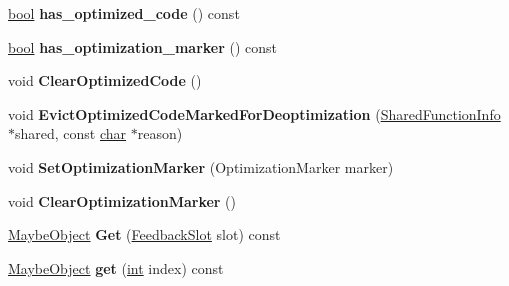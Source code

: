 \begin{DoxyCompactItemize}
\mbox{\hyperlink{classbool}{bool}} {\bfseries has\+\_\+optimized\+\_\+code} () const
\item 
\mbox{\label{classv8_1_1internal_1_1FeedbackVector_a53d2303ea56edeec2c69c9b21e463ce4}} 
\mbox{\hyperlink{classbool}{bool}} {\bfseries has\+\_\+optimization\+\_\+marker} () const
\item 
\mbox{\label{classv8_1_1internal_1_1FeedbackVector_ae38143d271689d1c7f162460772862f5}} 
void {\bfseries Clear\+Optimized\+Code} ()
\item 
\mbox{\label{classv8_1_1internal_1_1FeedbackVector_ab2598f90579fdd438d928e0ec2bf8dee}} 
void {\bfseries Evict\+Optimized\+Code\+Marked\+For\+Deoptimization} (\mbox{\hyperlink{classv8_1_1internal_1_1SharedFunctionInfo}{Shared\+Function\+Info}} $\ast$shared, const \mbox{\hyperlink{classchar}{char}} $\ast$reason)
\item 
\mbox{\label{classv8_1_1internal_1_1FeedbackVector_a2a8dd7f7d782fc6b3cbd9b8bc1ea0233}} 
void {\bfseries Set\+Optimization\+Marker} (Optimization\+Marker marker)
\item 
\mbox{\label{classv8_1_1internal_1_1FeedbackVector_a3f827b5aa64dbba6f3d71cf4d2311eb6}} 
void {\bfseries Clear\+Optimization\+Marker} ()
\item 
\mbox{\label{classv8_1_1internal_1_1FeedbackVector_ab845b60ed687cd767d3c49ddfe15df4d}} 
\mbox{\hyperlink{classv8_1_1internal_1_1MaybeObject}{Maybe\+Object}} {\bfseries Get} (\mbox{\hyperlink{classv8_1_1internal_1_1FeedbackSlot}{Feedback\+Slot}} slot) const
\item 
\mbox{\label{classv8_1_1internal_1_1FeedbackVector_ac8c1a8a9b0b526963043841b7e158af2}} 
\mbox{\hyperlink{classv8_1_1internal_1_1MaybeObject}{Maybe\+Object}} {\bfseries get} (\mbox{\hyperlink{classint}{int}} index) const
\item 
\mbox{\label{classv8_1_1internal_1_1FeedbackVector_ae5c34c13b97251662c4de1fa40e6ed9a}} 

\end{DoxyCompactItemize}
